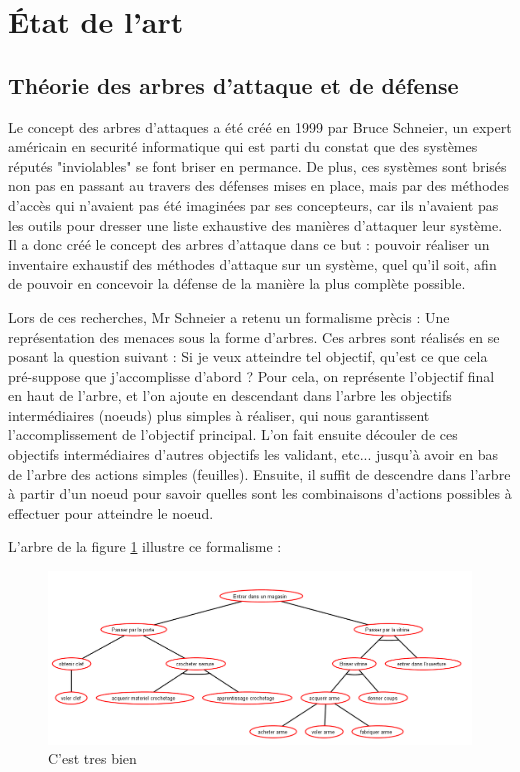 \section{\'Etat de l'art}

    \subsection{Théorie des arbres d'attaque et de défense}
        Le concept des arbres d'attaques a été créé en 1999 par Bruce Schneier, un expert américain en securité informatique qui est parti du constat que des systèmes réputés "inviolables" se font briser en permance. De plus, ces systèmes sont brisés non pas en passant au travers des défenses mises en place, mais par des méthodes d'accès qui n'avaient pas été imaginées par ses concepteurs, car ils n'avaient pas les outils pour dresser une liste exhaustive des manières d'attaquer leur système. Il a donc créé le concept des arbres d'attaque dans ce but : pouvoir réaliser un inventaire exhaustif des méthodes d'attaque sur un système, quel qu'il soit, afin de pouvoir en concevoir la défense de la manière la plus complète possible.

        Lors de ces recherches, Mr Schneier a retenu un formalisme prècis : Une représentation des menaces sous la forme d'arbres. Ces arbres sont réalisés en se posant la question suivant : Si je veux atteindre tel objectif, qu'est ce que cela pré-suppose que j'accomplisse d'abord ? Pour cela, on représente l'objectif final en haut de l'arbre, et l'on ajoute en descendant dans l'arbre les objectifs intermédiaires (noeuds) plus simples à réaliser, qui nous garantissent l'accomplissement de l'objectif principal. L'on fait ensuite découler de ces objectifs intermédiaires d'autres objectifs les validant, etc... jusqu'à avoir en bas de l'arbre des actions simples (feuilles). Ensuite, il suffit de descendre dans l'arbre à partir d'un noeud pour savoir quelles sont les combinaisons d'actions possibles à effectuer pour atteindre le noeud. 

        L'arbre de la figure \ref{fig:arbre_exemple_1} illustre ce formalisme : 

        \begin{figure}
            \begin{center}
                \includegraphics[width=1\textwidth]{figure/Entrer_dans_un_magasin.png}
            \end{center}
            \caption{C'est tres bien}
            \label{fig:arbre_exemple_1}
        \end{figure}

